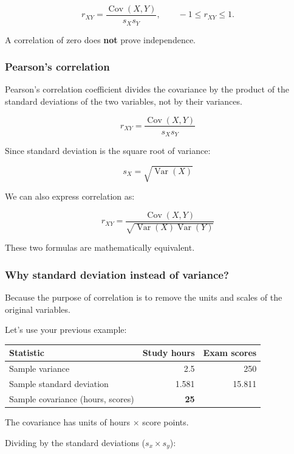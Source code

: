 \documentclass[11pt]{article}
\begin{document}
\[r_{XY}=\frac{\operatorname{Cov}(X,Y)}{s_Xs_Y},\qquad -1\le r_{XY}\le1.\]

A correlation of zero does \textbf{not} prove independence.

\subsubsection{Pearson's correlation}\label{pearsons-correlation}

Pearson's correlation coefficient divides the covariance by the product
of the standard deviations of the two variables, not by their variances.

\[
\boxed{r_{XY}=\frac{\operatorname{Cov}(X,Y)}{s_Xs_Y}}
\]

Since standard deviation is the square root of variance:

\[
s_X=\sqrt{\operatorname{Var}(X)}
\]

We can also express correlation as:

\[
\boxed{r_{XY}=\frac{\operatorname{Cov}(X,Y)}{\sqrt{\operatorname{Var}(X)\operatorname{Var}(Y)}}}
\]

These two formulas are mathematically equivalent.

\subsubsection{Why standard deviation instead of
variance?}\label{why-standard-deviation-instead-of-variance}

Because the purpose of correlation is to remove the units and scales of
the original variables.

Let's use your previous example:

{\def\LTcaptype{none} %
\begin{longtable}[]{@{}lrr@{}}
\toprule\noalign{}
Statistic & Study hours & Exam scores \\
\midrule\noalign{}
\endhead
\bottomrule\noalign{}
\endlastfoot
Sample variance & 2.5 & 250 \\
Sample standard deviation & 1.581 & 15.811 \\
Sample covariance (hours, scores) & \textbf{25} & \\
\end{longtable}
}

The covariance has units of hours × score points.

Dividing by the standard deviations (\(s_{x} \times s_{y}\)):
\end{document}
